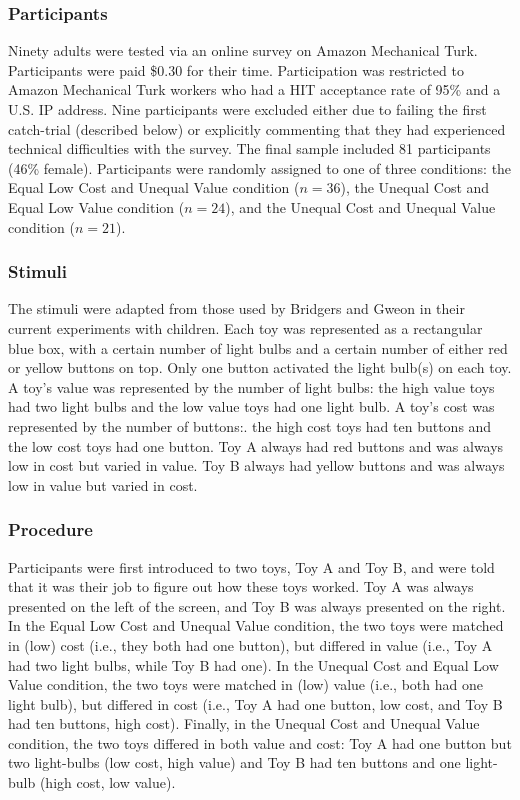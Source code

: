 \documentclass[10pt,letterpaper]{article}
\begin{document}
\subsubsection{Participants}

Ninety adults were tested via an online survey on Amazon Mechanical Turk. Participants were paid \$0.30 for their time. Participation was restricted to Amazon Mechanical Turk workers who had a HIT acceptance rate of 95\% and a U.S. IP address. Nine participants were excluded either due to failing the first catch-trial (described below) or explicitly commenting that they had experienced technical difficulties with the survey. The final sample included 81 participants (46\% female). Participants were randomly assigned to one of three conditions: the Equal Low Cost and Unequal Value condition ($n = 36$), the Unequal Cost and Equal Low Value condition ($n = 24$), and the Unequal Cost and Unequal Value condition ($n = 21$). 

\subsubsection{Stimuli}

The stimuli were adapted from those used by Bridgers and Gweon in their current experiments with children. Each toy was represented as a rectangular blue box, with a certain number of light bulbs and a certain number of either red or yellow buttons on top. Only one button activated the light bulb(s) on each toy. A toy's value was represented by the number of light bulbs: the high value toys had two light bulbs and the low value toys had one light bulb. A toy's cost was represented by the number of buttons:. the high cost toys had ten buttons and the low cost toys had one button. Toy A always had red buttons and was always low in cost but varied in value. Toy B always had yellow buttons and was always low in value but varied in cost.

\subsubsection{Procedure}

Participants were first introduced to two toys, Toy A and Toy B, and were told that it was their job to figure out how these toys worked. Toy A was always presented on the left of the screen, and Toy B was always presented on the right. In the Equal Low Cost and Unequal Value condition, the two toys were matched in (low) cost (i.e., they both had one button), but differed in value (i.e., Toy A had two light bulbs, while Toy B had one). In the Unequal Cost and Equal Low Value condition, the two toys were matched in (low) value (i.e., both had one light bulb), but differed in cost (i.e., Toy A had one button, low cost, and Toy B had ten buttons, high cost). Finally, in the Unequal Cost and Unequal Value condition, the two toys differed in both value and cost: Toy A had one button but two light-bulbs (low cost, high value) and Toy B had ten buttons and one light-bulb (high cost, low value). 
\end{document}
